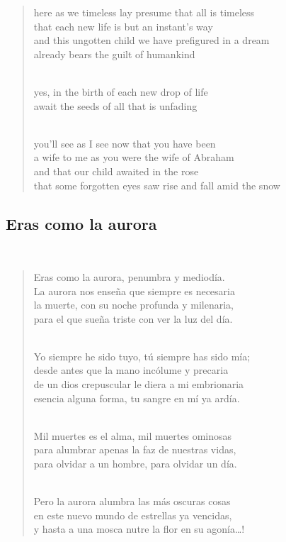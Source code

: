 \documentclass[a4paper, 12pt]{article}
\begin{document}
\begin{verse}
    
here as we timeless lay presume that all is timeless\\
that each new life is but an instant’s way\\
and this ungotten child we have prefigured in a dream\\
already bears the guilt of humankind\\
~ 

yes, in the birth of each new drop of life\\
await the seeds of all that is unfading\\
~ 

you’ll see as I see now that you have been\\
a wife to me as you were the wife of Abraham\\
and that our child awaited in the rose\\
that some forgotten eyes saw rise and fall amid the snow\\
\end{verse}

\pagebreak
\subsection{Eras como la aurora}
~ 

\begin{verse}
    
Eras como la aurora, penumbra y mediodía.\\
La aurora nos enseña que siempre es necesaria\\
la muerte, con su noche profunda y milenaria,\\
para el que sueña triste con ver la luz del día.\\
~ 

Yo siempre he sido tuyo, tú siempre has sido mía;\\
desde antes que la mano incólume y precaria\\
de un dios crepuscular le diera a mi embrionaria\\
esencia alguna forma, tu sangre en mí ya ardía.\\
~ 

Mil muertes es el alma, mil muertes ominosas\\
para alumbrar apenas la faz de nuestras vidas,\\
para olvidar a un hombre, para olvidar un día.\\
~ 

Pero la aurora alumbra las más oscuras cosas\\
en este nuevo mundo de estrellas ya vencidas,\\
y hasta a una mosca nutre la flor en su agonía…!\\
\end{verse}
\end{document}
